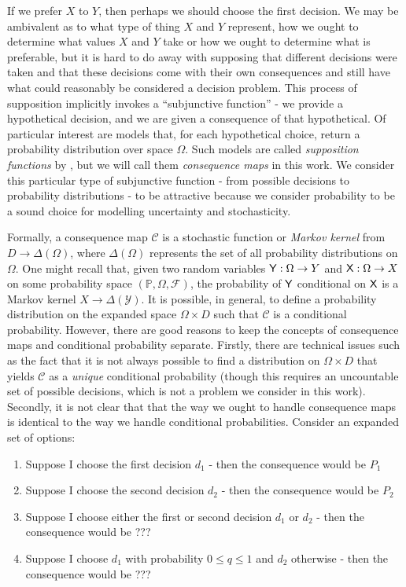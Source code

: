 If we prefer $X$ to $Y$, then perhaps we should choose the first decision. We may be ambivalent as to what type of thing $X$ and $Y$ represent, how we ought to determine what values $X$ and $Y$ take or how we ought to determine what is preferable, but it is hard to do away with supposing that different decisions were taken and that these decisions come with their own consequences and still have what could reasonably be considered a decision problem. This process of supposition implicitly invokes a ``subjunctive function'' - we provide a hypothetical decision, and we are given a consequence of that hypothetical. Of particular interest are models that, for each hypothetical choice, return a probability distribution over space $\Omega$. Such models are called \emph{supposition functions} by \citet{joyce_why_2000}, but we will call them \emph{consequence maps} in this work. We consider this particular type of subjunctive function - from possible decisions to probability distributions - to be attractive because we consider probability to be a sound choice for modelling uncertainty and stochasticity.

Formally, a consequence map $\mathscr{C}$ is a stochastic function or \emph{Markov kernel} from $D\to \Delta(\Omega)$, where $\Delta(\Omega)$ represents the set of all probability distributions on $\Omega$. One might recall that, given two random variables $\mathsf{Y}:\Omega\to Y$ and $\mathsf{X}:\Omega \to X$ on some probability space $(\mathbb{P},\Omega,\mathcal{F})$, the probability of $\mathsf{Y}$ conditional on $\mathsf{X}$ is a Markov kernel $X\to \Delta(\mathcal{Y})$. It is possible, in general, to define a probability distribution on the expanded space $\Omega\times D$ such that $\mathscr{C}$ is a conditional probability. However, there are good reasons to keep the concepts of consequence maps and conditional probability separate. Firstly, there are technical issues such as the fact that it is not always possible to find a distribution on $\Omega\times D$ that yields $\mathscr{C}$ as a \emph{unique} conditional probability \citep{hajek_what_2003} (though this requires an uncountable set of possible decisions, which is not a problem we consider in this work). Secondly, it is not clear that that the way we ought to handle consequence maps is identical to the way we handle conditional probabilities. Consider an expanded set of options:

\begin{enumerate}
	\item Suppose I choose the first decision $d_1$ - then the consequence would be $P_1$
	\item Suppose I choose the second decision $d_2$ - then the consequence would be $P_2$
	\item Suppose I choose either the first or second decision $d_1$ or $d_2$ - then the consequence would be ???
	\item Suppose I choose $d_1$ with probability $0\leq q\leq 1$ and $d_2$ otherwise - then the consequence would be ???
\end{enumerate}

